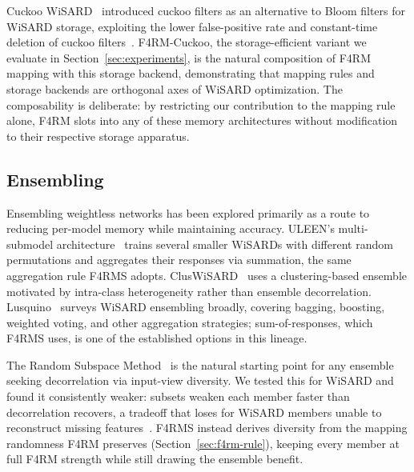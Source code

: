 Cuckoo WiSARD~\cite{santiago2019thesis} introduced cuckoo filters as an alternative to Bloom filters for WiSARD storage, exploiting the lower false-positive rate and constant-time deletion of cuckoo filters~\cite{fan2014cuckoo}. F4RM-Cuckoo, the storage-efficient variant we evaluate in Section~\ref{sec:experiments}, is the natural composition of F4RM mapping with this storage backend, demonstrating that mapping rules and storage backends are orthogonal axes of WiSARD optimization. The composability is deliberate: by restricting our contribution to the mapping rule alone, F4RM slots into any of these memory architectures without modification to their respective storage apparatus.

\subsection{Ensembling}
\label{sec:rw-ensembling}

Ensembling weightless networks has been explored primarily as a route to reducing per-model memory while maintaining accuracy. ULEEN's multi-submodel architecture~\cite{susskind2023uleen} trains several smaller WiSARDs with different random permutations and aggregates their responses via summation, the same aggregation rule F4RMS adopts. ClusWiSARD~\cite{cardoso2017clus} uses a clustering-based ensemble motivated by intra-class heterogeneity rather than ensemble decorrelation. Lusquino~\cite{lusquino2021thesis} surveys WiSARD ensembling broadly, covering bagging, boosting, weighted voting, and other aggregation strategies; sum-of-responses, which F4RMS uses, is one of the established options in this lineage.

The Random Subspace Method~\cite{ho1998random} is the natural starting point for any ensemble seeking decorrelation via input-view diversity. We tested this for WiSARD and found it consistently weaker: subsets weaken each member faster than decorrelation recovers, a tradeoff that loses for WiSARD members unable to reconstruct missing features~\cite{breiman2001random}. F4RMS instead derives diversity from the mapping randomness F4RM preserves (Section~\ref{sec:f4rm-rule}), keeping every member at full F4RM strength while still drawing the ensemble benefit.

